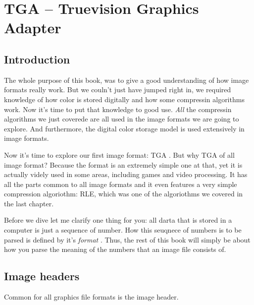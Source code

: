 \begin{comment}
  
\end{comment}

\chapter{TGA -- Truevision Graphics Adapter}
\label{cha:tga}

\begin{refsection}

  \cite{91:_truev_tga_file_format_specif}


  \section{Introduction}
  \label{sec:introduction}

  The whole purpose of this book, was to give a good understanding of
  how image formats really work. But we couln't just have jumped right
  in, we required knowledge of how color is stored digitally and how
  some compressin algorithms work. Now it's time to put that knowledge
  to good use. \textit{All} the compressin algorithms we just coverede
  are all used in the image formats we are going to explore. And
  furthermore, the digital color storage model is used extensively in
  image formats.

  Now it's time to explore our first image format: TGA . But why TGA of
  all image format? Because the format is an extremely simple one at
  that, yet it is actually videly used in some areas, including games
  and video processing. It has all the parts common to all image
  formats and it even features a very simple compression algoriothm:
  RLE, which was one of the algoriothms we covered in the last
  chapter.

  Before we dive let me clarify one thing for you: all darta that is
  stored in a computer is just a sequence of number. How this seuqnece
  of numbers is to be parsed is defined by it's \textit{format}
  . Thus, the rest of this book will simply be about how
  you parse the meaning of the numbers that an image file consists
  of. 

  \section{Image headers}
  \label{sec:image-headers}

  Common for all graphics file formats is the image header.

  \printbibliography[heading=subbibliography]

\end{refsection}